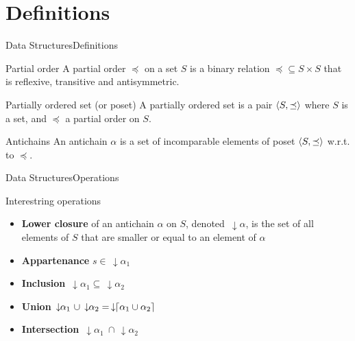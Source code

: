 \documentclass[10pt]{beamer}
\DeclarePairedDelimiter{\ceil}{\lceil}{\rceil}
\DeclarePairedDelimiter{\tuple}{\langle}{\rangle}
\newcommand{\darrow}{\, \downarrow \!\!}
\begin{document}
\section{Definitions}

\begin{frame}{Data Structures}{Definitions}
    \begin{block}{Partial order}
        A partial order $\preceq$ on a set $S$ is a binary relation
        $\preceq \subseteq S \times S$
        that is reflexive, transitive and antisymmetric.
    \end{block}
    \begin{block}{Partially ordered set (or poset)}
    A partially ordered set is a pair $\tuple{S, \preceq}$
    where $S$ is a set, and $\preceq$ a partial order on $S$.
    \end{block}
    \begin{block}{Antichains}
    An antichain $\alpha$ is a set of incomparable
    elements of poset $\tuple{S, \preceq}$ w.r.t. to $\preceq$.
    \end{block}

\end{frame}

\begin{frame}{Data Structures}{Operations}
    \begin{block}{Interestring operations}
    \begin{itemize}
        \item \textbf{Lower closure} of an antichain $\alpha$
        on $S$, denoted $\darrow{\alpha}$,
        is the set of all elements of $S$ that are smaller or equal
        to an element of $\alpha$
        \item \textbf{Appartenance} $s \in \darrow \alpha_1$
        \item \textbf{Inclusion} $\darrow \alpha_1 \subseteq \darrow \alpha_2$
        \item \textbf{Union} $ \darrow \alpha_1 \ \cup \darrow \alpha_2 =
        \darrow \ceil{\alpha_1 \cup \alpha_2}$
        \item \textbf{Intersection} $\darrow \alpha_1 \ \cap \darrow \alpha_2$
    \end{itemize}
    \end{block}

\end{frame}
\end{document}
